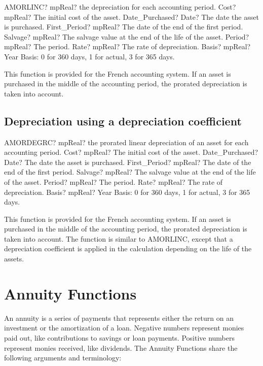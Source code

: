 \begin{mpFunctionsExtract}
	\mpWorksheetFunctionSevenNotImplemented
	{AMORLINC? mpReal? the depreciation for each accounting period.}
	{Cost? mpReal?  The initial cost of the asset.}
	{Date\_Purchased? Date? The date the asset is purchased.}
	{First\_Period? mpReal? The date of the end of the first period.}
	{Salvage? mpReal? The salvage value at the end of the life of the asset.}
	{Period? mpReal? The period.}
	{Rate? mpReal? The rate of depreciation.}
	{Basis? mpReal? Year Basis: 0 for 360 days, 1 for actual, 3 for 365 days.}
\end{mpFunctionsExtract}

\vspace{0.3cm}
This function is provided for the French accounting system. If an asset is purchased in the middle of the accounting period, the prorated depreciation is taken into account.


\subsection{Depreciation using a depreciation coefficient}


\begin{mpFunctionsExtract}
	\mpWorksheetFunctionSevenNotImplemented
	{AMORDEGRC? mpReal? the prorated linear depreciation of an asset for each accounting period.}
	{Cost? mpReal?  The initial cost of the asset.}
	{Date\_Purchased? Date? The date the asset is purchased.}
	{First\_Period? mpReal? The date of the end of the first period.}
	{Salvage? mpReal? The salvage value at the end of the life of the asset.}
	{Period? mpReal? The period.}
	{Rate? mpReal? The rate of depreciation.}
	{Basis? mpReal? Year Basis: 0 for 360 days, 1 for actual, 3 for 365 days.}
\end{mpFunctionsExtract}


\vspace{0.3cm}
This function is provided for the French accounting system. If an asset is purchased in the middle of the accounting period, the prorated depreciation is taken into account. The function is similar to AMORLINC, except that a depreciation coefficient is applied in the calculation depending on the life of the assets.






\newpage
\section{Annuity Functions}
\label{AnnuityFunctions}
An annuity is a series of payments that represents either the return on an investment or the amortization of a loan. Negative numbers represent monies paid out, like contributions to savings or loan payments. Positive numbers represent monies received, like dividends. The Annuity Functions share the following arguments and terminology:

